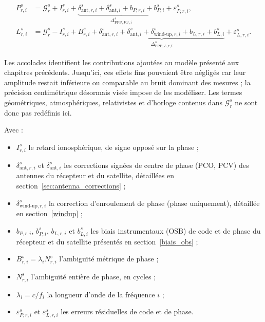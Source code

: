 \begin{align}
P_{r,i}^{s}
&=
\mathcal G_r^s
+I_{r,i}^s
+\underbrace{
\delta_{\mathrm{ant},r,i}^s
+\delta_{\mathrm{ant},i}^{s}
+b_{P,r,i}+b_{P,i}^s
}_{\Delta_{\mathrm{PPP},P,r,i}^s}
+\varepsilon_{P,r,i}^s,
\label{eq:ppp_code_raw}
\\
L_{r,i}^{s}
&=
\mathcal G_r^s
-I_{r,i}^s
+B_{r,i}^s
+\underbrace{
\delta_{\mathrm{ant},r,i}^s
+\delta_{\mathrm{ant},i}^{s}
+\delta_{\mathrm{wind\text{-}up},r,i}^s 
+b_{L,r,i}+b_{L,i}^s
}_{\Delta_{\mathrm{PPP},L,r,i}^s}
+\varepsilon_{L,r,i}^s.
\label{eq:ppp_phase_raw}
\end{align}

Les accolades identifient les contributions ajoutées au modèle présenté aux
chapitres précédents. Jusqu'ici, ces effets fins pouvaient être négligés car
leur amplitude restait inférieure ou comparable au bruit dominant des mesures ;
la précision centimétrique désormais visée impose de les modéliser. Les termes
géométriques, atmosphériques, relativistes et d'horloge contenus dans
$\mathcal G_r^s$ ne sont donc pas redéfinis ici.

Avec :

\begin{itemize}
    \item $I_{r,i}^s$ le retard ionosphérique, de signe opposé sur la phase ;
    \item $\delta_{\mathrm{ant},r,i}^s$ et $\delta_{\mathrm{ant},i}^{s}$ les corrections signées de centre de phase (PCO, PCV) des antennes du récepteur et du satellite, détaillées en section~\ref{sec:antenna_corrections} ;
    \item $\delta_{\mathrm{wind\text{-}up},r,i}^s$ la correction d'enroulement de phase (phase uniquement), détaillée en section~\ref{windup} ;
    \item $b_{P,r,i}$, $b_{P,i}^s$, $b_{L,r,i}$ et $b_{L,i}^s$ les biais instrumentaux (OSB) de code et de phase du récepteur et du satellite présentés en section~\ref{biais_obs} ;
    \item $B_{r,i}^s=\lambda_iN_{r,i}^s$ l'ambiguïté métrique de phase ;
    \item $N_{r,i}^s$ l'ambiguïté entière de phase, en cycles ;
    \item $\lambda_i = c/f_i$ la longueur d'onde de la fréquence $i$ ;
    \item $\varepsilon_{P,r,i}^s$ et $\varepsilon_{L,r,i}^s$ les erreurs résiduelles de code et de phase.
\end{itemize}

